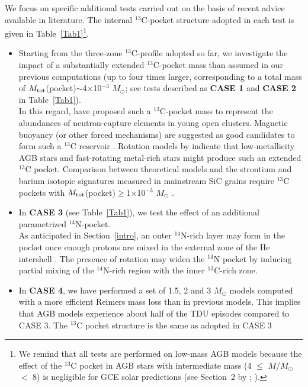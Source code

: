 \documentclass[manuscript]{aastex}
\begin{document}
 
We focus on specific additional tests carried out 
on the basis of recent advice available in literature.
The internal $^{13}$C-pocket structure adopted in each test is given in 
Table~\ref{Tab1}\footnote{We remind that all tests are performed on low-mass AGB models
because the effect of the $^{13}$C pocket in AGB stars with intermediate mass 
(4 $\leq$ $M$/$M_\odot$ $<$ 8) is negligible for GCE solar predictions (see 
Section~2 by \citealt{bisterzo14}; \citealt{straniero14}).}. 
\begin{itemize}
\item Starting from the three-zone $^{13}$C-profile adopted so far, we investigate the impact 
of a substantially extended $^{13}$C-pocket mass than assumed in our previous computations
(up to four times larger, corresponding to a total mass of $M_{\rm tot}$(pocket)$\sim$4$\times$10$^{-3}$ $M_\odot$;
see tests described as {\bf CASE 1} and {\bf CASE 2} in Table~\ref{Tab1}).
\\
In this regard, \citet{maiorca12} have proposed such a $^{13}$C-pocket mass to represent the 
abundances of neutron-capture elements in young open clusters. Magnetic buoyancy (or other forced
mechanisms) are suggested as good candidates to form such a $^{13}$C reservoir \citep{trippella14}. 
Rotation models by \citet{piersanti13} indicate that 
low-metallicity AGB stars 
and fast-rotating metal-rich stars might produce such an extended $^{13}$C pocket. 
Comparison between theoretical models and the strontium and barium isotopic signatures 
measured in mainstream SiC grains require $^{13}$C pockets with 
$M_{\rm tot}$(pocket)$\geq$1$\times$10$^{-3}$ $M_\odot$
\citep{liu15}.
\item In {\bf CASE 3} (see Table~\ref{Tab1}), we test the effect of an additional parametrized 
$^{14}$N-pocket.
\\
As anticipated in Section~\ref{intro}, an outer $^{14}$N-rich layer may form in the 
pocket once enough protons are mixed in the external zone of the He intershell
\citep{goriely00,cristallo09,cristallo11,karakas10,lugaro12,trippella14}.
The presence of rotation may widen the 
$^{14}$N pocket by inducing partial mixing of the $^{14}$N-rich region with the inner 
$^{13}$C-rich zone.
\item In {\bf CASE 4}, we have performed a set of 1.5, 2 and 3 $M_\odot$ models 
computed with a more efficient Reimers mass loss than in previous models.
This implies that AGB models experience about half of the TDU episodes compared to CASE 3.
The $^{13}$C pocket structure is the same as adopted in CASE 3 

\end{itemize}
\end{document}
